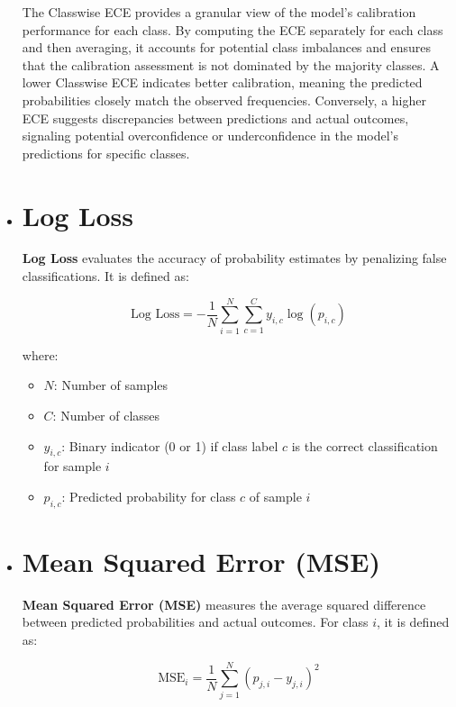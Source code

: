 \begin{itemize}
The Classwise ECE provides a granular view of the model's calibration performance for each class. By computing the ECE separately for each class and then averaging, it accounts for potential class imbalances and ensures that the calibration assessment is not dominated by the majority classes. A lower Classwise ECE indicates better calibration, meaning the predicted probabilities closely match the observed frequencies. Conversely, a higher ECE suggests discrepancies between predictions and actual outcomes, signaling potential overconfidence or underconfidence in the model's predictions for specific classes.

\item \section{Log Loss}
\label{subsubsec:log_loss}

\textbf{Log Loss} evaluates the accuracy of probability estimates by penalizing false classifications. It is defined as:

\[
    \text{Log Loss} = -\frac{1}{N} \sum_{i=1}^{N} \sum_{c=1}^{C} y_{i,c} \log(p_{i,c})
    \label{eq:log_loss}
\]

where:
\begin{itemize}
    \item $N$: Number of samples
    \item $C$: Number of classes
    \item $y_{i,c}$: Binary indicator (0 or 1) if class label $c$ is the correct classification for sample $i$
    \item $p_{i,c}$: Predicted probability for class $c$ of sample $i$
\end{itemize}

\item \section{Mean Squared Error (MSE)}
\label{subsubsec:mse}

\textbf{Mean Squared Error (MSE)} measures the average squared difference between predicted probabilities and actual outcomes. For class $i$, it is defined as:

\[
    \text{MSE}_i = \frac{1}{N} \sum_{j=1}^{N} (p_{j,i} - y_{j,i})^2
    \label{eq:mse}
\]

\end{itemize}